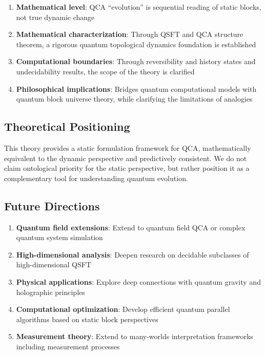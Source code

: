 \documentclass[11pt]{article}
\theoremstyle{definition}
\theoremstyle{remark}
\begin{document}
\begin{enumerate}
\item \textbf{Mathematical level}: QCA ``evolution'' is sequential reading of static blocks, not true dynamic change
\item \textbf{Mathematical characterization}: Through QSFT and QCA structure theorem, a rigorous quantum topological dynamics foundation is established
\item \textbf{Computational boundaries}: Through reversibility and history states and undecidability results, the scope of the theory is clarified
\item \textbf{Philosophical implications}: Bridges quantum computational models with quantum block universe theory, while clarifying the limitations of analogies
\end{enumerate}

\subsection{Theoretical Positioning}

This theory provides a static formulation framework for QCA, mathematically equivalent to the dynamic perspective and predictively consistent. We do not claim ontological priority for the static perspective, but rather position it as a complementary tool for understanding quantum evolution.

\subsection{Future Directions}

\begin{enumerate}
\item \textbf{Quantum field extensions}: Extend to quantum field QCA or complex quantum system simulation
\item \textbf{High-dimensional analysis}: Deepen research on decidable subclasses of high-dimensional QSFT
\item \textbf{Physical applications}: Explore deep connections with quantum gravity and holographic principles
\item \textbf{Computational optimization}: Develop efficient quantum parallel algorithms based on static block perspectives
\item \textbf{Measurement theory}: Extend to many-worlds interpretation frameworks including measurement processes
\end{enumerate}
\end{document}
